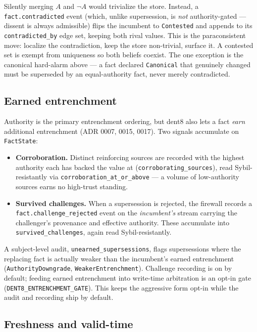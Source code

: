 \documentclass[11pt]{article}
\newcommand{\code}[1]{\texttt{#1}}
\begin{document}
Silently merging $A$ and $\neg A$ would trivialize the store. Instead, a \code{fact.contradicted} event (which, unlike supersession, is \emph{not} authority-gated --- dissent is always admissible) flips the incumbent to \code{Contested} and appends to its \code{contradicted\_by} edge set, keeping both rival values. This is the paraconsistent move: localize the contradiction, keep the store non-trivial, surface it. A contested set is exempt from uniqueness so both beliefs coexist. The one exception is the canonical hard-alarm above --- a fact declared \code{Canonical} that genuinely changed must be superseded by an equal-authority fact, never merely contradicted.

\subsection{Earned entrenchment}

Authority is the primary entrenchment ordering, but dent8 also lets a fact \emph{earn} additional entrenchment (ADR 0007, 0015, 0017). Two signals accumulate on \code{FactState}:

\begin{itemize}[leftmargin=*]
  \item \textbf{Corroboration.} Distinct reinforcing sources are recorded with the highest authority each has backed the value at (\code{corroborating\_sources}), read Sybil-resistantly via \code{corroboration\_at\_or\_above} --- a volume of low-authority sources earns no high-trust standing.
  \item \textbf{Survived challenges.} When a supersession is rejected, the firewall records a \code{fact.challenge\_rejected} event on the \emph{incumbent's} stream carrying the challenger's provenance and effective authority. These accumulate into \code{survived\_challenges}, again read Sybil-resistantly.
\end{itemize}

A subject-level audit, \code{unearned\_supersessions}, flags supersessions where the replacing fact is actually weaker than the incumbent's earned entrenchment (\code{AuthorityDowngrade}, \code{WeakerEntrenchment}). Challenge recording is on by default; feeding earned entrenchment into write-time arbitration is an opt-in gate (\code{DENT8\_ENTRENCHMENT\_GATE}). This keeps the aggressive form opt-in while the audit and recording ship by default.

\subsection{Freshness and valid-time}
\end{document}
